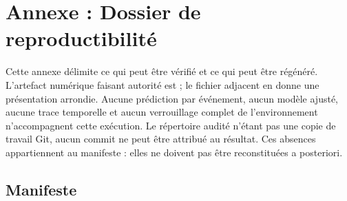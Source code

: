 \documentclass[11pt,a4paper,oneside]{report}
\theoremstyle{definition}
\theoremstyle{plain}
\begin{document}
\chapter{Annexe : Dossier de reproductibilité}
\label{app:reproducibility}

Cette annexe délimite ce qui peut être vérifié et ce qui peut être régénéré.
L'artefact numérique faisant autorité est
 ; le fichier
 adjacent en donne une présentation arrondie. Aucune
prédiction par événement, aucun modèle ajusté, aucune trace temporelle et aucun
verrouillage complet de l'environnement n'accompagnent cette exécution. Le
répertoire audité n'étant pas une copie de travail Git, aucun commit ne peut
être attribué au résultat. Ces absences appartiennent au manifeste : elles ne
doivent pas être reconstituées a posteriori.

\section{Manifeste}
\label{app:manifest}
\end{document}

